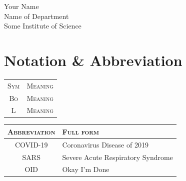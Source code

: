 \documentclass[a4paper, oneside, 11pt]{book}
\begin{document}
Your Name\\
Name of Department\\
Some Institute of Science\\[2em]
\newpage

\chapter*{Notation \& Abbreviation}
\begin{center}
\begin{tabular}{| c | l |}
\hline
	\textsc{Sym} & \textsc{Meaning}\\
	\textsc{Bo} & \textsc{Meaning}\\
	\textsc{L} & \textsc{Meaning}\\
	\hline\hline

\end{tabular}
\end{center}

\begin{center}
\begin{tabular}{| c | l |}
\hline
	\textsc{Abbreviation} & \textsc{Full form}\\
	\hline\hline
  COVID-19 & Coronavirus Disease of 2019 \\
  SARS & Severe Acute Respiratory Syndrome \\
  OID & Okay I'm Done \\
  \hline
	\end{tabular}
\end{center}

{
\hypersetup{linkcolor=black}
\begin{singlespace}
\newpage\tableofcontents
\newpage\listoffigures
\newpage\listoftables
\end{singlespace}
}


\newpage
{}
\mainmatter
\end{document}
